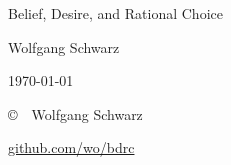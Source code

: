 \begingroup
\thispagestyle{empty}

\begin{center}

{
  \headerfont
  
  \huge Belief, Desire, and Rational Choice\par}

  \vspace{15mm}

  {\large Wolfgang Schwarz}

  \vspace{2mm}
  {\normalsize \today}

\end{center}

\vfill
\endgroup
{

  \footnotesize

 \noindent \copyright\ \the\year\ Wolfgang Schwarz

 \smallskip
 \noindent \href{https://github.com/wo/bdrc}{github.com/wo/bdrc}

 \vspace{-1.5mm}
 \doclicenseThis

}

{
\tableofcontents 
}



